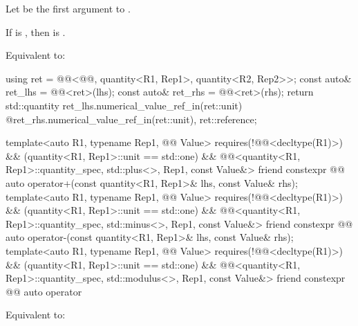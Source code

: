 \begin{itemdescr}
\pnum
Let  be the first argument to .

\pnum
\expects
If  is \tcode{\%}, then  is .

\pnum
\effects
Equivalent to:
\begin{codeblock}
using ret = @@<@@, quantity<R1, Rep1>, quantity<R2, Rep2>>;
const auto& ret_lhs = @@<ret>(lhs);
const auto& ret_rhs = @@<ret>(rhs);
return std::quantity{
  ret_lhs.numerical_value_ref_in(ret::unit) @\atsign@ ret_rhs.numerical_value_ref_in(ret::unit),
  ret::reference};
\end{codeblock}
\end{itemdescr}

\begin{itemdecl}
template<auto R1, typename Rep1, @@ Value>
  requires(!@@<decltype(R1)>) && (quantity<R1, Rep1>::unit == std::one) &&
          @@<quantity<R1, Rep1>::quantity_spec, std::plus<>, Rep1, const Value&>
friend constexpr @@ auto operator+(const quantity<R1, Rep1>& lhs, const Value& rhs);
template<auto R1, typename Rep1, @@ Value>
  requires(!@@<decltype(R1)>) && (quantity<R1, Rep1>::unit == std::one) &&
          @@<quantity<R1, Rep1>::quantity_spec, std::minus<>, Rep1, const Value&>
friend constexpr @@ auto operator-(const quantity<R1, Rep1>& lhs, const Value& rhs);
template<auto R1, typename Rep1, @@ Value>
  requires(!@@<decltype(R1)>) && (quantity<R1, Rep1>::unit == std::one) &&
          @@<quantity<R1, Rep1>::quantity_spec, std::modulus<>, Rep1, const Value&>
friend constexpr @@ auto operator%
\end{itemdecl}

\begin{itemdescr}
\pnum
\effects
Equivalent to:
\end{itemdescr}


